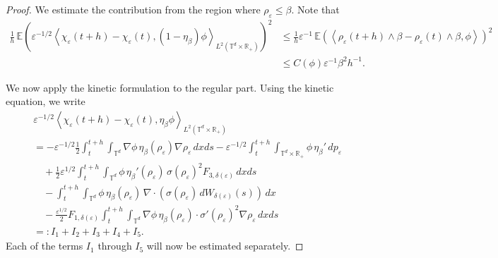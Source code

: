 \documentclass[UTF-8,reqno]{amsart}
\numberwithin{equation}{section}
\def\leq{\leqslant}
\def\leq{\leqslant}
\begin{document}
\begin{proof}
We estimate the contribution from the region where $\rho_{\varepsilon} \leq \beta$. Note that
\begin{align*}
\frac{1}{h} \, \mathbb{E} \left( \varepsilon^{-1/2} \left\langle \chi_{\varepsilon}(t + h) - \chi_{\varepsilon}(t), (1 - \eta_{\beta}) \phi \right\rangle_{L^2(\mathbb{T}^d\times\mathbb{R}_+)} \right)^2 &\leq \frac{1}{h} \varepsilon^{-1} \, \mathbb{E} \left( \left\langle \rho_{\varepsilon}(t + h) \wedge \beta - \rho_{\varepsilon}(t) \wedge \beta, \phi \right\rangle \right)^2 \\
&\leq C(\phi) \varepsilon^{-1} \beta^2 h^{-1}.
\end{align*}


We now apply the kinetic formulation to the regular part. Using the kinetic equation, we write
\begin{align*}
&\varepsilon^{-1/2} \left\langle \chi_{\varepsilon}(t + h) - \chi_{\varepsilon}(t), \eta_{\beta} \phi \right\rangle_{L^2(\mathbb{T}^d\times\mathbb{R}_+)}\\ 
&= -\varepsilon^{-1/2} \frac{1}{2}\int_t^{t + h} \int_{\mathbb{T}^d} \nabla \phi \, \eta_{\beta}(\rho_{\varepsilon}) \nabla \rho_{\varepsilon} \, dx ds 
- \varepsilon^{-1/2} \int_t^{t + h} \int_{\mathbb{T}^d \times \mathbb{R}_+} \phi \, \eta_{\beta}' \, dp_{\varepsilon} \\
&\quad+ \frac{1}{2} \varepsilon^{1/2} \int_t^{t + h} \int_{\mathbb{T}^d} \phi \, \eta_{\beta}'(\rho_{\varepsilon}) \, \sigma(\rho_{\varepsilon})^2 F_{3,\delta(\varepsilon)} \, dx ds \\
&\quad- \int_t^{t + h} \int_{\mathbb{T}^d} \phi \, \eta_{\beta}(\rho_{\varepsilon}) \, \nabla \cdot (\sigma(\rho_{\varepsilon}) \, dW_{\delta(\varepsilon)}(s)) \, dx \\
&\quad- \frac{\varepsilon^{1/2}}{2} F_{1,\delta(\varepsilon)} \int_t^{t + h} \int_{\mathbb{T}^d} \nabla\phi \, \eta_{\beta}(\rho_{\varepsilon})  \cdot  \sigma'(\rho_{\varepsilon})^2 \nabla \rho_{\varepsilon}  \, dx ds \\
&=: I_1 + I_2 + I_3 + I_4 + I_5.
\end{align*}
Each of the terms $ I_1 $ through $ I_5 $ will now be estimated separately. 


\end{proof}
\end{document}
